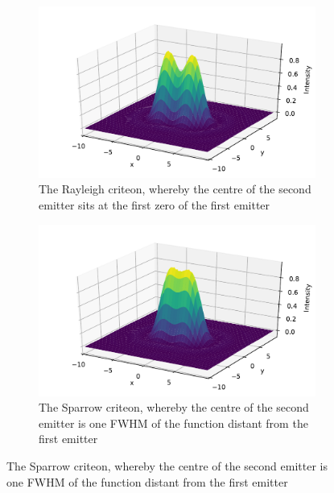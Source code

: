 \begin{figure}
    \centering
    \begin{subfigure}[b]{\textwidth}
        \centering
        \includegraphics{+airy_rayleigh}
        \caption{The Rayleigh criteon, whereby the centre of the second emitter sits at the first zero of the first emitter}
        \label{fig:airy_rayleigh}
    \end{subfigure}
    \begin{subfigure}[b]{\textwidth}
        \includegraphics{+airy_sparrow}
        \caption{The Sparrow criteon, whereby the centre of the second emitter is one FWHM of the function distant from the first emitter}
        \label{fig:airy_sparrow}
    \end{subfigure}
    \end{figure}
